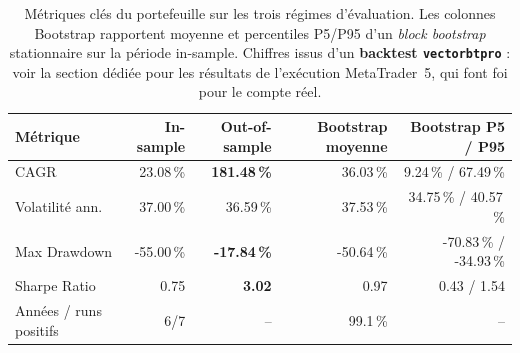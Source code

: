 \begin{table}[H]
\centering
\caption{Métriques clés du portefeuille sur les trois régimes d'évaluation. Les colonnes Bootstrap rapportent moyenne et percentiles P5/P95 d'un \emph{block bootstrap} stationnaire sur la période in-sample. Chiffres issus d'un \textbf{backtest \texttt{vectorbtpro}} : voir la section dédiée pour les résultats de l'exécution MetaTrader~5, qui font foi pour le compte réel.}
\label{tab:metrics_summary}
\begin{tabular}{lrrrr}
\toprule
Métrique & In-sample & Out-of-sample & Bootstrap moyenne & Bootstrap P5 / P95 \\
\midrule
CAGR & 23.08\,\% & \textbf{181.48\,\%} & 36.03\,\% & 9.24\,\% / 67.49\,\% \\
Volatilité ann. & 37.00\,\% & 36.59\,\% & 37.53\,\% & 34.75\,\% / 40.57\,\% \\
Max Drawdown & -55.00\,\% & \textbf{-17.84\,\%} & -50.64\,\% & -70.83\,\% / -34.93\,\% \\
Sharpe Ratio & 0.75 & \textbf{3.02} & 0.97 & 0.43 / 1.54 \\
Années / runs positifs & 6/7 & -- & 99.1\,\% & -- \\
\bottomrule
\end{tabular}
\end{table}
